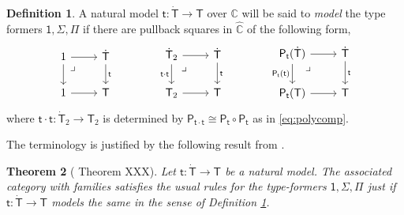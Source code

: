 \documentclass[12pt]{article}
\newcommand{\C}{\ensuremath{\mathbb{C}}}
\newcommand{\alg}[1]{\ensuremath{\mathsf{#1}}}
\renewcommand{\to}{\ensuremath{\rightarrow}}
\renewcommand{\t}{\ensuremath{\mathsf{t}}}
\newcommand{\tT}{\ensuremath{{\t}:\TT\to\T}}
\newcommand{\T}{\ensuremath{\mathsf{T}}}
\newcommand{\TT}{\ensuremath{\dot{\mathsf{T}}}}
\newcommand{\pbcorner}{\arrow[dr,phantom,"\lrcorner" very near start, shift right=.5ex]} %
\newtheorem{theorem}{Theorem}
\theoremstyle{remark}
\theoremstyle{definition}
\newtheorem{definition}[theorem]{Definition}
\begin{document}
\begin{definition}\label{def:modelthetypeformers}
A natural model $\tT$ over $\C$ will be said to \emph{model} the type formers $ \mathsf{1}, \Sigma, \Pi$ if there are pullback squares in $\hat{\C}$ of the following form,
%
\begin{equation}\label{diag:naturalmodelPiSigma1}
\begin{tikzcd}
	1 \ar[r] \ar[d] \pbcorner &  \TT \ar[d, "\t"]\\  
	1 \ar[r] & \T
 \end{tikzcd} \qquad \qquad 
 \begin{tikzcd}
	\TT_2  \ar[r] \ar[d,swap,"\t\cdot\t"] \pbcorner &  \TT \ar[d, "\t"]\\  
	\T_2 \ar[r] & \T
	 \end{tikzcd} \qquad \qquad 
	 \begin{tikzcd}
	 \alg{P}_\t(\TT) \ar[r] \ar[d,swap,"\alg{P}_\t(\t)"] \pbcorner &  \TT \ar[d, "\t"]\\  
	\alg{P}_\t(\T) \ar[r] & \T
 \end{tikzcd} 
 \end{equation}
%
where $\t\cdot\t : \dot{\T}_2 \to \T_2$ is determined by $\alg{P}_{\t\cdot\t} \cong  \alg{P}_{\t} \circ \alg{P}_{\t}$ as in \eqref{eq:polycomp}.
\end{definition}

The terminology is justified by the following result from \cite{A:NM}.

%
\begin{theorem}[\cite{Awodey:NM} Theorem XXX]\label{thm:nmcwf}
Let $\tT$ be a natural model. The associated category with families satisfies the usual rules for the type-formers $\mathsf{1}, \Sigma, \Pi$ just if $\tT$ models the same in the sense of Definition \ref{def:modelthetypeformers}.
\end{theorem}
\end{document}
